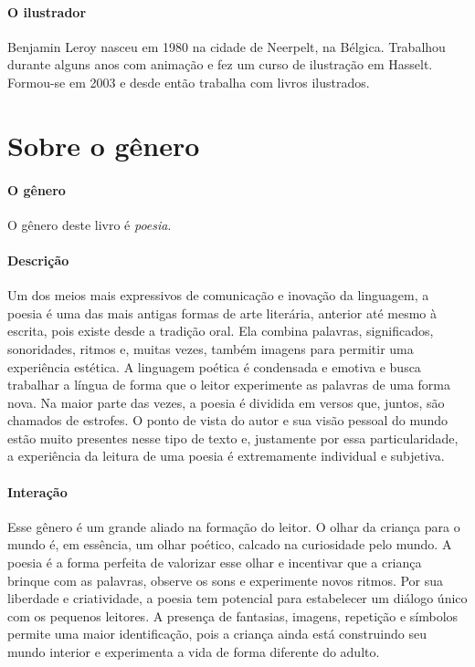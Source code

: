 \documentclass[11pt]{extarticle}
\begin{document}
\paragraph{O ilustrador} Benjamin Leroy nasceu em 1980 na cidade de Neerpelt, na Bélgica. Trabalhou durante alguns anos com animação e fez um curso de ilustração em Hasselt. Formou-se em 2003 e desde então trabalha com livros ilustrados.



\section{Sobre o gênero}

\paragraph{O gênero} O gênero deste livro é \textit{poesia}. 


\paragraph{Descrição} Um dos meios mais expressivos de comunicação e inovação da linguagem, a poesia é uma das mais antigas formas de arte literária, anterior até mesmo à escrita, pois existe desde a tradição oral. Ela combina palavras, significados, sonoridades, ritmos e, muitas vezes, também imagens para permitir uma experiência estética. A linguagem poética é condensada e emotiva e busca trabalhar a língua de forma que o leitor experimente as palavras de uma forma nova. Na maior parte das vezes, a poesia é dividida em versos que, juntos, são chamados de estrofes. O ponto de vista do autor e sua visão pessoal do mundo estão muito presentes nesse tipo de texto e, justamente por essa particularidade, a experiência da leitura de uma poesia é extremamente individual e subjetiva.

\paragraph{Interação} Esse gênero é um grande aliado na formação do leitor. O olhar da criança para o mundo é, em essência, um olhar poético, calcado na curiosidade pelo mundo. A poesia é a forma perfeita de valorizar esse olhar e incentivar que a criança brinque com as palavras, observe os sons e experimente novos ritmos. Por sua liberdade e criatividade, a poesia tem potencial para estabelecer um diálogo único com os pequenos leitores. A presença de fantasias, imagens, repetição e símbolos permite uma maior identificação, pois a criança ainda está construindo seu mundo interior e experimenta a vida de forma diferente do adulto. 
\end{document}
